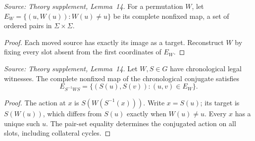 \begin{definition}
  \label{def:nonfixed-map}
  \leanok
  \textit{Source: Theory supplement, Lemma~14.}
  For a permutation \(W\), let \(E_W=\{(u,W(u)):W(u)\ne u\}\) be its
  complete nonfixed map, a set of ordered pairs in \(\Sigma\times\Sigma\).
\end{definition}
\begin{proof}
  \leanok
  Each moved source has exactly its image as a target. Reconstruct \(W\)
  by fixing every slot absent from the first coordinates of \(E_W\).
\end{proof}

\begin{lemma}
  \label{lem:endpoint-transport}
  \leanok
  \textit{Source: Theory supplement, Lemma~14.}
  Let \(W,S\in G\) have chronological legal witnesses. The complete
  nonfixed map of the chronological conjugate satisfies
  \[
    E_{S^{-1}WS}=\{(S(u),S(v)):(u,v)\in E_W\}.
  \]
\end{lemma}
\begin{proof}
  \leanok
  The action at \(x\) is \(S(W(S^{-1}(x)))\). Write \(x=S(u)\); its
  target is \(S(W(u))\), which differs from \(S(u)\) exactly when
  \(W(u)\ne u\). Every \(x\) has a unique such \(u\). The pair-set
  equality determines the conjugated action on all slots, including
  collateral cycles.
\end{proof}

